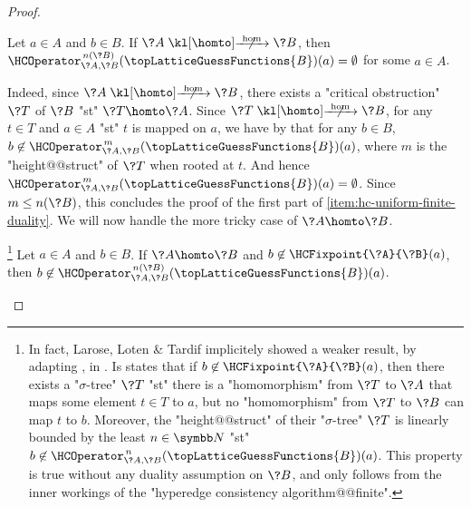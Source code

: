 \begin{proof}
	\begin{claim}%
		\AP\label{claim:hyperedge-consistency-uniform-convergence-no-hom}
		Let $a\in A$ and $b\in B$.
		If $\?A \nothomto \?B$, then $\HCOperator^{\,n(\?B)}_{\?A,\?B}(\topLatticeGuessFunctions{B})(a) = \emptyset$ for some $a \in A$.
	\end{claim}
	Indeed, since $\?A \nothomto \?B$, there exists a "critical obstruction" $\?T$ of $\?B$
	"st" $\?T \homto \?A$. Since $\?T \nothomto \?B$, for any $t \in T$ and $a\in A$
	"st" $t$ is mapped on $a$, we have by  that for any $b\in B$,
	$b \not\in \HCOperator^{\,m}_{\?A,\?B}(\topLatticeGuessFunctions{B})(a)$,
	where $m$ is the "height@@struct" of $\?T$ when rooted at $t$.
	And hence $\HCOperator^{\,m}_{\?A,\?B}(\topLatticeGuessFunctions{B})(a) = \emptyset$.
	Since $m \leq n(\?B)$, this concludes the proof of the first part of
	\eqref{item:hc-uniform-finite-duality}. We will now handle the more tricky case of
	$\?A \homto \?B$.
	
	\begin{claim}%
		\!\footnote{In fact, Larose, Loten \& Tardif implicitely showed a weaker result, by adapting
			\cite[Theorem 21]{FederVardi1998ComputationalStructure}, in
			\cite[Proof of Lemma 3.2]{LaroseLotenTardif2007CharacterisationFOCSP}.
			Is states that
			if $b \not\in \HCFixpoint{\?A}{\?B}(a)$, then there
			exists a "$\sigma$-tree" $\?T$ "st" there is a "homomorphism" from $\?T$ to $\?A$
			that maps some element $t \in T$ to $a$, but no "homomorphism" from $\?T$ to $\?B$
			can map $t$ to $b$. Moreover, the "height@@struct" of their "$\sigma$-tree" $\?T$ is linearly 
			bounded by the least $n\in \N$ "st"
			$b\not\in \HCOperator^{\,n}_{\?A,\?B}(\topLatticeGuessFunctions{B})(a)$.
			This property is true without any duality assumption on $\?B$, and only follows
			from the inner workings of the "hyperedge consistency algorithm@@finite".}%
		\AP\label{claim:hyperedge-consistency-uniform-convergence-hom}
		Let $a\in A$ and $b\in B$.
		If $\?A \homto \?B$ and $b \not\in \HCFixpoint{\?A}{\?B}(a)$,
		then $b \not\in \HCOperator^{\,n(\?B)}_{\?A,\?B}(\topLatticeGuessFunctions{B})(a)$.
	\end{claim}


\end{proof}
